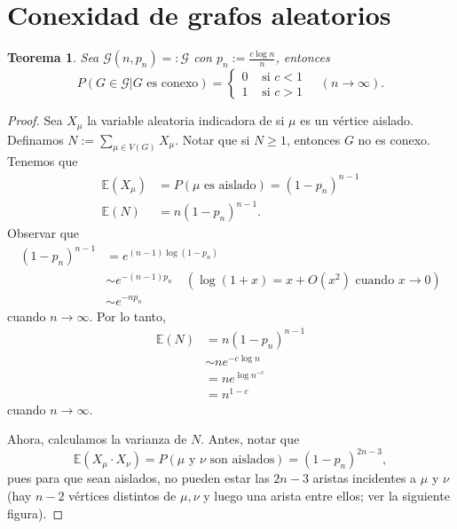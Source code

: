 \documentclass[12pt]{report}
\theoremstyle{plain}
\newtheorem{theorem}{Teorema}[section]
\theoremstyle{definition}
\begin{document}
\section{Conexidad de grafos aleatorios}

\begin{theorem}
Sea $\mathcal G (n, p_n) =: \mathcal G$ con $p_n := \frac{c \log n}{n}$, entonces
\[
    P ( G \in \mathcal G | G \text{ es conexo}) = \begin{cases}
    0 & \text{ si $c < 1$} \\
    1 & \text{ si $c > 1$}
    \end{cases} \quad (n \to \infty).
\]
\end{theorem}
\begin{proof}
Sea $X_\mu$ la variable aleatoria indicadora de si $\mu$ es un vértice aislado. Definamos $N := \sum_{\mu \in V(G)} X_\mu$. Notar que si $N \geq 1$, entonces $G$ no es conexo. Tenemos que
\begin{align*}
\mathbb{E} (X_\mu) &= P ( \mu \text{ es aislado}) = (1- p_n)^{n-1} \\
\mathbb{E} (N) &= n (1-p_n)^{n-1}.
\end{align*}
Observar que
\begin{align*}
(1-p_n)^{n-1} &= e^{(n-1) \log (1- p_n)} \\
&\sim e^{-(n-1) p_n}  \quad (\log (1 + x) = x + O(x^2) \text{ cuando $x \to 0$})\\
&\sim e^{-n p_n}
\end{align*}
cuando $n \to \infty$. Por lo tanto,
\begin{align*}
\mathbb{E} (N) &= n (1-p_n)^{n-1} \\
&\sim n e^{- c \log n} \\
&= n e^{\log n^{-c}} \\
&= n^{1-c}
\end{align*}
cuando $n \to \infty$.

Ahora, calculamos la varianza de $N$. Antes, notar que
\[
    \mathbb{E} (X_\mu \cdot X_\nu) = P (\mu \text{ y } \nu \text{ son aislados}) = (1-p_n)^{2n-3},
\]
pues para que sean aislados, no pueden estar las $2n-3$ aristas incidentes a $\mu$ y $\nu$ (hay $n-2$ vértices distintos de $\mu, \nu$ y luego una arista entre ellos; ver la siguiente figura).




\end{proof}
\end{document}
